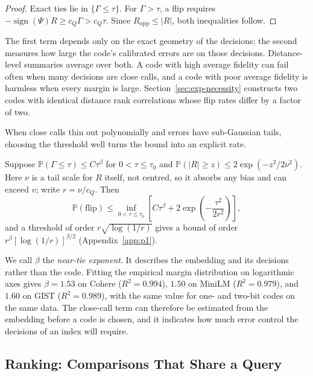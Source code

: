 \documentclass[twoside,11pt]{article}
\newcommand{\Pp}{\mathbb{P}}
\newcommand{\sign}{\operatorname{sign}}
\begin{document}
\begin{proof}
Exact ties lie in $\{\Gamma\le\tau\}$. For $\Gamma>\tau$, a flip requires $-\sign(\Psi)R\ge c_Q\Gamma>c_Q\tau$. Since $R_{\mathrm{opp}}\le|R|$, both inequalities follow.
\end{proof}

The first term depends only on the exact geometry of the decisions; the second measures how large the code's calibrated errors are on those decisions. Distance-level summaries average over both. A code with high average fidelity can fail often when many decisions are close calls, and a code with poor average fidelity is harmless when every margin is large. Section~\ref{sec:exp-necessity} constructs two codes with identical distance rank correlations whose flip rates differ by a factor of two.

When close calls thin out polynomially and errors have sub-Gaussian tails, choosing the threshold well turns the bound into an explicit rate.

\begin{corollary}
\label{cor:subgaussian}
Suppose $\Pp(\Gamma\le\tau)\le C\tau^\beta$ for $0<\tau\le\tau_0$ and $\Pp(|R|\ge z)\le2\exp(-z^2/2\nu^2)$. Here $\nu$ is a tail scale for $R$ itself, not centred, so it absorbs any bias and can exceed $v$; write $r=\nu/c_Q$. Then
\begin{equation}
\Pp(\text{flip})\le\inf_{0<\tau\le\tau_0}\left[C\tau^\beta+2\exp\!\left(-\frac{\tau^2}{2r^2}\right)\right],
\label{eq:small-ball-bound}
\end{equation}
and a threshold of order $r\sqrt{\log(1/r)}$ gives a bound of order $r^\beta[\log(1/r)]^{\beta/2}$ (Appendix~\ref{app:p1}).
\end{corollary}

We call $\beta$ the \emph{near-tie exponent}. It describes the embedding and its decisions rather than the code. Fitting the empirical margin distribution on logarithmic axes gives $\beta=1.53$ on Cohere ($R^2=0.994$), $1.50$ on MiniLM ($R^2=0.979$), and $1.60$ on GIST ($R^2=0.989$), with the same value for one- and two-bit codes on the same data. The close-call term can therefore be estimated from the embedding before a code is chosen, and it indicates how much error control the decisions of an index will require.

\subsection{Ranking: Comparisons That Share a Query}
\label{sec:ranking}
\end{document}
